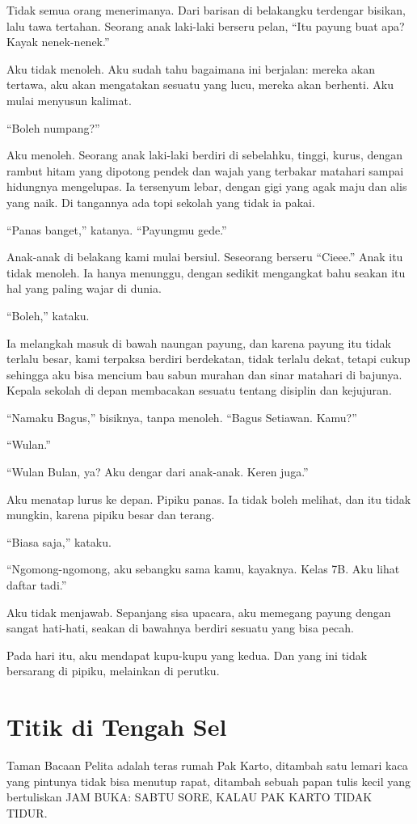 \documentclass[11pt,twoside,openany]{book}
\begin{document}
Tidak semua orang menerimanya. Dari barisan di belakangku terdengar bisikan, lalu tawa tertahan. Seorang anak laki-laki berseru pelan, ``Itu payung buat apa? Kayak nenek-nenek.''

Aku tidak menoleh. Aku sudah tahu bagaimana ini berjalan: mereka akan tertawa, aku akan mengatakan sesuatu yang lucu, mereka akan berhenti. Aku mulai menyusun kalimat.

``Boleh numpang?''

Aku menoleh. Seorang anak laki-laki berdiri di sebelahku, tinggi, kurus, dengan rambut hitam yang dipotong pendek dan wajah yang terbakar matahari sampai hidungnya mengelupas. Ia tersenyum lebar, dengan gigi yang agak maju dan alis yang naik. Di tangannya ada topi sekolah yang tidak ia pakai.

``Panas banget,'' katanya. ``Payungmu gede.''

Anak-anak di belakang kami mulai bersiul. Seseorang berseru ``Cieee.'' Anak itu tidak menoleh. Ia hanya menunggu, dengan sedikit mengangkat bahu seakan itu hal yang paling wajar di dunia.

``Boleh,'' kataku.

Ia melangkah masuk di bawah naungan payung, dan karena payung itu tidak terlalu besar, kami terpaksa berdiri berdekatan, tidak terlalu dekat, tetapi cukup sehingga aku bisa mencium bau sabun murahan dan sinar matahari di bajunya. Kepala sekolah di depan membacakan sesuatu tentang disiplin dan kejujuran.

``Namaku Bagus,'' bisiknya, tanpa menoleh. ``Bagus Setiawan. Kamu?''

``Wulan.''

``Wulan Bulan, ya? Aku dengar dari anak-anak. Keren juga.''

Aku menatap lurus ke depan. Pipiku panas. Ia tidak boleh melihat, dan itu tidak mungkin, karena pipiku besar dan terang.

``Biasa saja,'' kataku.

``Ngomong-ngomong, aku sebangku sama kamu, kayaknya. Kelas 7B. Aku lihat daftar tadi.''

Aku tidak menjawab. Sepanjang sisa upacara, aku memegang payung dengan sangat hati-hati, seakan di bawahnya berdiri sesuatu yang bisa pecah.

Pada hari itu, aku mendapat kupu-kupu yang kedua. Dan yang ini tidak bersarang di pipiku, melainkan di perutku.

\chapter{Titik di Tengah Sel}
Taman Bacaan Pelita adalah teras rumah Pak Karto, ditambah satu lemari kaca yang pintunya tidak bisa menutup rapat, ditambah sebuah papan tulis kecil yang bertuliskan JAM BUKA: SABTU SORE, KALAU PAK KARTO TIDAK TIDUR.
\end{document}
